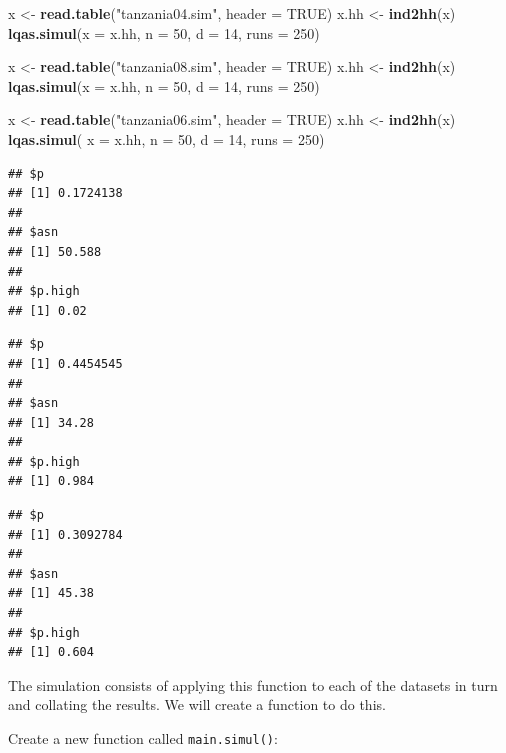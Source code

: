 \documentclass[12pt,a4paper]{book}
\newenvironment{Shaded}{\begin{snugshade}}{\end{snugshade}}
\newcommand{\KeywordTok}[1]{\textcolor[rgb]{0.13,0.29,0.53}{\textbf{#1}}}
\newcommand{\DataTypeTok}[1]{\textcolor[rgb]{0.13,0.29,0.53}{#1}}
\newcommand{\DecValTok}[1]{\textcolor[rgb]{0.00,0.00,0.81}{#1}}
\newcommand{\StringTok}[1]{\textcolor[rgb]{0.31,0.60,0.02}{#1}}
\newcommand{\OtherTok}[1]{\textcolor[rgb]{0.56,0.35,0.01}{#1}}
\newcommand{\NormalTok}[1]{#1}
\theoremstyle{definition}
\theoremstyle{definition}
\theoremstyle{definition}
\theoremstyle{remark}
\begin{document}
\begin{Shaded}
\begin{Highlighting}[]
\NormalTok{x <-}\StringTok{ }\KeywordTok{read.table}\NormalTok{(}\StringTok{"tanzania04.sim"}\NormalTok{, }\DataTypeTok{header =} \OtherTok{TRUE}\NormalTok{)}
\NormalTok{x.hh <-}\StringTok{ }\KeywordTok{ind2hh}\NormalTok{(x)}
\KeywordTok{lqas.simul}\NormalTok{(}\DataTypeTok{x =}\NormalTok{ x.hh, }\DataTypeTok{n =} \DecValTok{50}\NormalTok{, }\DataTypeTok{d =} \DecValTok{14}\NormalTok{, }\DataTypeTok{runs =} \DecValTok{250}\NormalTok{)}

\NormalTok{x <-}\StringTok{ }\KeywordTok{read.table}\NormalTok{(}\StringTok{"tanzania08.sim"}\NormalTok{, }\DataTypeTok{header =} \OtherTok{TRUE}\NormalTok{)}
\NormalTok{x.hh <-}\StringTok{ }\KeywordTok{ind2hh}\NormalTok{(x)}
\KeywordTok{lqas.simul}\NormalTok{(}\DataTypeTok{x =}\NormalTok{ x.hh, }\DataTypeTok{n =} \DecValTok{50}\NormalTok{, }\DataTypeTok{d =} \DecValTok{14}\NormalTok{, }\DataTypeTok{runs =} \DecValTok{250}\NormalTok{)}

\NormalTok{x <-}\StringTok{ }\KeywordTok{read.table}\NormalTok{(}\StringTok{"tanzania06.sim"}\NormalTok{, }\DataTypeTok{header =} \OtherTok{TRUE}\NormalTok{)}
\NormalTok{x.hh <-}\StringTok{ }\KeywordTok{ind2hh}\NormalTok{(x)}
\KeywordTok{lqas.simul}\NormalTok{( }\DataTypeTok{x =}\NormalTok{ x.hh, }\DataTypeTok{n =} \DecValTok{50}\NormalTok{, }\DataTypeTok{d =} \DecValTok{14}\NormalTok{, }\DataTypeTok{runs =} \DecValTok{250}\NormalTok{)}
\end{Highlighting}
\end{Shaded}

\begin{verbatim}
## $p
## [1] 0.1724138
## 
## $asn
## [1] 50.588
## 
## $p.high
## [1] 0.02
\end{verbatim}

\begin{verbatim}
## $p
## [1] 0.4454545
## 
## $asn
## [1] 34.28
## 
## $p.high
## [1] 0.984
\end{verbatim}

\begin{verbatim}
## $p
## [1] 0.3092784
## 
## $asn
## [1] 45.38
## 
## $p.high
## [1] 0.604
\end{verbatim}

The simulation consists of applying this function to each of the
datasets in turn and collating the results. We will create a function to
do this.

Create a new function called \texttt{main.simul()}:
\end{document}
